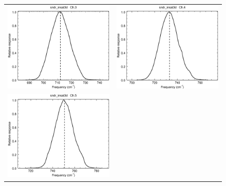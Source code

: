 \begin{figure}[H]
\begin{tabular}{c c}
    \includegraphics[scale=0.35]{graphics/sndr/srf/sndr_insat3d-3.eps} &
    \includegraphics[scale=0.35]{graphics/sndr/srf/sndr_insat3d-4.eps} \\
    \includegraphics[scale=0.35]{graphics/sndr/srf/sndr_insat3d-5.eps} &

\end{tabular}
\end{figure}
